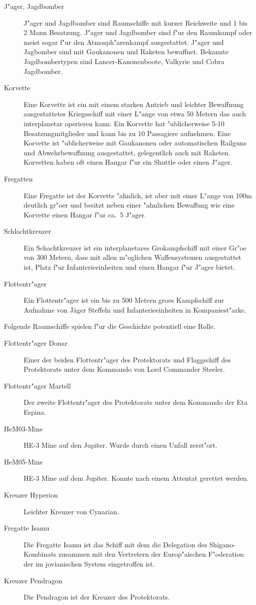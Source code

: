 \begin{description}
\item [J"ager, Jagdbomber] J"ager und Jagdbomber sind Raumschiffe mit kurzer Reichweite und 1 bis 2 Mann Besatzung.
      J"ager und Jagdbomber sind f"ur den Raumkampf oder meist sogar f"ur den Atmosph"arenkampf ausgestattet. J"ager und Jagbomber sind mit Gau\3kanonen und Raketen bewaffnet. Bekannte Jagdbombertypen sind Lancer-Kanonenboote, Valkyrie  und Cobra Jagdbomber.
\item [Korvette] Eine Korvette ist ein mit einem starken Antrieb und leichter Bewaffnung ausgestattetes Kriegsschiff
      mit einer L"ange von etwa 50 Metern das auch interplanetar operieren kann. Ein Korvette hat "ublicherweise 5-10 Besatzungmitglieder und kann bis zu 10 Passagiere aufnehmen. Eine Korvette ist "ublicherweise mit Gau\3kanonen oder automatischen Railguns und Abwehrbewaffnung ausgestattet, gelegentlich auch mit Raketen. Korvetten haben oft einen Hangar f"ur ein Shuttle oder einen J"ager.
\item [Fregatten] Eine Fregatte ist der Korvette "ahnlich, ist aber mit einer L"ange von 100m deutlich gr"o\3er und besitzt
      neben einer "ahnlichen Bewaffung wie eine Korvette einen Hangar f"ur ca.~5 J"ager.
\item [Schlachtkreuzer] Ein Schachtkreuzer ist ein interplanetares Gro\3kampfschiff mit einer Gr"o\3e von 300 Metern,
      dass mit allen m"oglichen Waffensystemen ausgestattet ist, Platz f"ur Infanterieeinheiten und einen Hangar f"ur J"ager bietet.
\item [Flottentr"ager] Ein Flottentr"ager ist ein bis zu 500 Metern gro\3es Kampfschiff zur Aufnahme von
      Jäger Steffeln und Infanterieeinheiten in Kompaniest"arke.
\end{description}

Folgende Raumschiffe spielen f"ur die Geschichte potentiell eine Rolle.

\begin{description}
\item [Flottentr"ager Donar] Einer der beiden Flottentr"ager des Protektorats und Flaggschiff des Protektorats unter
       dem Kommando von Lord Commander Steeler.
\item [Flottentr"ager Martell] Der zweite Flottentr"ager des Protektorats unter dem Kommando der Eta Espina.
\item [HeM03-Mine] HE-3 Mine auf den Jupiter. Wurde durch einen Unfall zerst"ort.
\item [HeM05-Mine] HE-3 Mine auf dem Jupiter. Konnte nach einem Attentat gerettet werden.
\item [Kreuzer Hyperion] Leichter Kreuzer von Cynarian.
\item [Fregatte Isamu] Die Fregatte Isamu ist das Schiff mit dem die Delegation des Shigano-Kombinats zusammen mit den 
      Vertretern der Europ"aischen F"oderation der im jovianischen System eingetroffen ist.
\item [Kreuzer Pendragon] Die Pendragon ist der Kreuzer des Protektorats.
\end{description}

